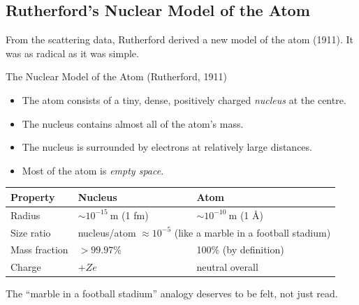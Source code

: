 \documentclass[12pt, a4paper]{book}
\theoremstyle{definition}
\newcommand{\newterm}[1]{\textit{\textcolor{DiscoveryColor}{#1}}}
\begin{document}
\subsection{Rutherford's Nuclear Model of the Atom}

From the scattering data, Rutherford derived a new model
of the atom (1911).
It was as radical as it was simple.

\begin{namedconcept}{The Nuclear Model of the Atom (Rutherford, 1911)}
\begin{itemize}[nosep, leftmargin=2em]
  \item The atom consists of a tiny, dense, positively charged
        \newterm{nucleus} at the centre.
  \item The nucleus contains almost all of the atom's mass.
  \item The nucleus is surrounded by electrons at relatively
        large distances.
  \item Most of the atom is \emph{empty space}.
\end{itemize}

\begin{center}
\begin{tabular}{lll}
\toprule
Property & Nucleus & Atom \\
\midrule
Radius & $\sim 10^{-15}\ \si{\metre}$ (1 fm) &
         $\sim 10^{-10}\ \si{\metre}$ (1 \AA) \\
Size ratio & \multicolumn{2}{l}{nucleus/atom $\approx 10^{-5}$
             (like a marble in a football stadium)} \\
Mass fraction & $> 99.97\%$ & 100\% (by definition) \\
Charge & $+Ze$ & neutral overall \\
\bottomrule
\end{tabular}
\end{center}
\end{namedconcept}

\vspace{0.5em}

The ``marble in a football stadium'' analogy deserves to be
felt, not just read.
\end{document}
